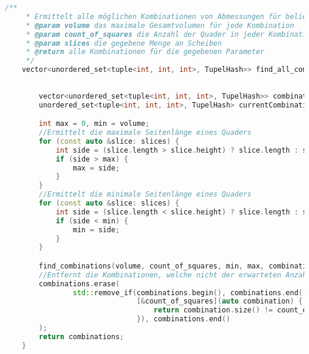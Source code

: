 \documentclass[a4paper,10pt,ngerman]{scrartcl}
\begin{document}
    \begin{lstlisting}[frame=single,language=C++,title=Methode find\_all\_combinations,breaklines=true,label={lst:code_findAllCombinations}]
    /**
     * Ermittelt alle möglichen Kombinationen von Abmessungen für beliebig viele Quader
     * @param volume das maximale Gesamtvolumen für jede Kombination
     * @param count_of_squares die Anzahl der Quader in jeder Kombination
     * @param slices die gegebene Menge an Scheiben
     * @return alle Kombinationen für die gegebenen Parameter
     */
    vector<unordered_set<tuple<int, int, int>, TupelHash>> find_all_combinations(int volume,
                                                                                 int count_of_squares,
                                                                                 const vector<Slice> &slices) {
        vector<unordered_set<tuple<int, int, int>, TupelHash>> combinations;
        unordered_set<tuple<int, int, int>, TupelHash> currentCombination;

        int max = 0, min = volume;
        //Ermittelt die maximale Seitenlänge eines Quaders
        for (const auto &slice: slices) {
            int side = (slice.length > slice.height) ? slice.length : slice.height;
            if (side > max) {
                max = side;
            }
        }
        //Ermittelt die minimale Seitenlänge eines Quaders
        for (const auto &slice: slices) {
            int side = (slice.length < slice.height) ? slice.length : slice.height;
            if (side < min) {
                min = side;
            }
        }

        find_combinations(volume, count_of_squares, min, max, combinations, currentCombination);
        //Entfernt die Kombinationen, welche nicht der erwarteten Anzahl von Quadern entsprechen
        combinations.erase(
                std::remove_if(combinations.begin(), combinations.end(),
                               [&count_of_squares](auto combination) {
                                   return combination.size() != count_of_squares;
                               }), combinations.end()
        );
        return combinations;
    }
    \end{lstlisting}
\end{document}
